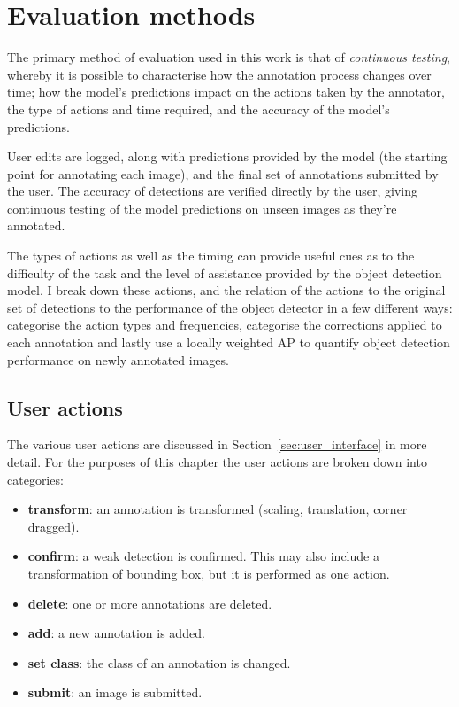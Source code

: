 \section {Evaluation methods}
\label{sec:ann_evaluation}

The primary method of evaluation used in this work is that of \emph{continuous testing}, whereby it is possible to characterise how the annotation process changes over time; how the model's predictions impact on the actions taken by the annotator, the type of actions and time required, and the accuracy of the model's predictions.

User edits are logged, along with predictions provided by the model (the starting point for annotating each image), and the final set of annotations submitted by the user. The accuracy of detections are verified directly by the user, giving continuous testing of the model predictions on unseen images as they're annotated.

The types of actions as well as the timing can provide useful cues as to the difficulty of the task and the level of assistance provided by the object detection model. I break down these actions, and the relation of the actions to the original set of detections to the performance of the object detector in a few different ways: categorise the action types and frequencies, categorise the corrections applied to each annotation and lastly use a locally weighted \gls{AP} to quantify object detection performance on newly annotated images.

\subsection{User actions}

The various user actions are discussed in Section~\ref{sec:user_interface} in more detail. For the purposes of this chapter the user actions are broken down into categories:

\begin{itemize}
    \item {\bf transform}: an annotation is transformed (scaling, translation, corner dragged).
    \item {\bf confirm}: a weak detection is confirmed. This may also include a transformation of bounding box, but it is performed as one action.
    \item {\bf delete}: one or more annotations are deleted.
    \item {\bf add}: a new annotation is added.
    \item {\bf set class}: the class of an annotation is changed.    
    \item {\bf submit}: an image is submitted.    
\end{itemize}

